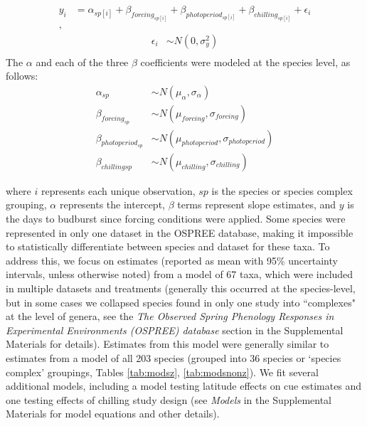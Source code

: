 \documentclass{article}
\begin{document}
\begin{align*}
y_i &= \alpha_{sp[i]} + \beta_{forcing_{sp[i]}} + \beta_{photoperiod_{sp[i]}} + \beta_{chilling_{sp[i]}} + \epsilon_i\\,
\end{align*}
\begin{align*}
\epsilon_i & \sim N(0,\sigma^2_y) \\
\end{align*}
\noindent The $\alpha$ and each of the three $\beta$ coefficients were modeled at the species level, as follows:
\begin{align*}
\alpha_{sp} & \sim N(\mu_{\alpha}, \sigma_{\alpha}) \\
\beta_{forcing_{sp}} & \sim N(\mu_{forcing}, \sigma_{forcing}) \\
\beta_{photoperiod_{sp}} & \sim N(\mu_{photoperiod}, \sigma_{photoperiod})\\
\beta_{chilling{sp}} & \sim N(\mu_{chilling}, \sigma_{chilling})
\end{align*}

where $i$ represents each unique observation, $sp$ is the species or species complex grouping, $\alpha$ represents the intercept, $\beta$ terms represent slope estimates, and $y$ is the days to budburst since forcing conditions were applied. Some species were represented in only one dataset in the OSPREE database, making it impossible to statistically differentiate between species and dataset for these taxa. To address this, we focus on estimates (reported as mean with 95\% uncertainty intervals, unless otherwise noted) from a model of 67 taxa, which were included in multiple datasets and treatments (generally this occurred at the species-level, but in some cases we collapsed species found in only one study into ``complexes" at the level of genera, see the \emph{The Observed Spring Phenology Responses in Experimental Environments (OSPREE) database} section in the Supplemental Materials for details). Estimates from this model were generally similar to estimates from a model of all 203 species (grouped into 36 species or `species complex' groupings, Tables \ref{tab:modsz}, \ref{tab:modsnonz}).  We fit several additional models, including a model testing latitude effects on cue estimates and one testing effects of chilling study design (see \emph{Models} in the Supplemental Materials for model equations and other details). %
\end{document}
